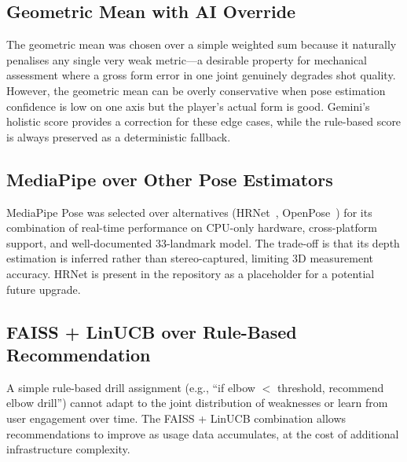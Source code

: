 \subsection{Geometric Mean with AI Override}

The geometric mean was chosen over a simple weighted sum because it naturally penalises any single very weak metric---a desirable property for mechanical assessment where a gross form error in one joint genuinely degrades shot quality. However, the geometric mean can be overly conservative when pose estimation confidence is low on one axis but the player's actual form is good. Gemini's holistic score provides a correction for these edge cases, while the rule-based score is always preserved as a deterministic fallback.

\subsection{MediaPipe over Other Pose Estimators}

MediaPipe Pose was selected over alternatives (HRNet~\cite{Sun2019}, OpenPose~\cite{Cao2017}) for its combination of real-time performance on CPU-only hardware, cross-platform support, and well-documented 33-landmark model. The trade-off is that its depth estimation is inferred rather than stereo-captured, limiting 3D measurement accuracy. HRNet is present in the repository as a placeholder for a potential future upgrade.

\subsection{FAISS + LinUCB over Rule-Based Recommendation}

A simple rule-based drill assignment (e.g., ``if elbow $< $ threshold, recommend elbow drill'') cannot adapt to the joint distribution of weaknesses or learn from user engagement over time. The FAISS + LinUCB combination allows recommendations to improve as usage data accumulates, at the cost of additional infrastructure complexity.
